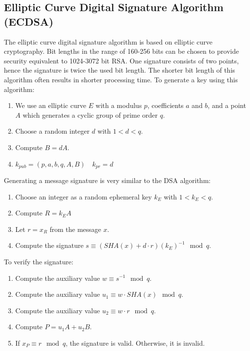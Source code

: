 \documentclass{math}
\begin{document}
\subsection*{Elliptic Curve Digital Signature Algorithm (ECDSA)}
The elliptic curve digital signature algorithm is based on elliptic curve
cryptography. Bit lengths in the range of 160-256 bits can be chosen to provide
security equivalent to 1024-3072 bit RSA. One signature consists of two points,
hence the signature is twice the used bit length. The shorter bit length of this
algorithm often results in shorter processing time. To generate a key using this
algorithm:
\begin{enumerate}
  \item We use an elliptic curve \( E \) with a modulus \( p \), coefficients
  \( a \) and \( b \), and a point \( A \) which generates a cyclic group of
  prime order \( q \).
  \item Choose a random integer \( d \) with \( 1 < d < q \).
  \item Compute \( B = dA \).
  \item \( k_{pub} = (p,a,b,q,A,B) \quad k_{pr} = d \)
\end{enumerate}
Generating a message signature is very similar to the DSA algorithm:
\begin{enumerate}
  \item Choose an integer as a random ephemeral key \( k_E \) with
  \( 1 < k_E < q \).
  \item Compute \( R = k_EA \)
  \item Let \( r = x_R \) from the message \( x \).
  \item Compute the signature \( s \equiv (SHA(x)+d\cdot r)(k_E)^{-1}\mod q \).
\end{enumerate}
To verify the signature:
\begin{enumerate}
  \item Compute the auxiliary value \( w\equiv s^{-1}\mod q \).
  \item Compute the auxiliary value \( u_1\equiv w\cdot SHA(x)\mod q \).
  \item Compute the auxiliary value \( u_2\equiv w\cdot r\mod q \).
  \item Compute \( P = u_1A+u_2B \).
  \item If \( x_P \equiv r\mod q \), the signature is valid. Otherwise, it is
  invalid.
\end{enumerate}
\end{document}
